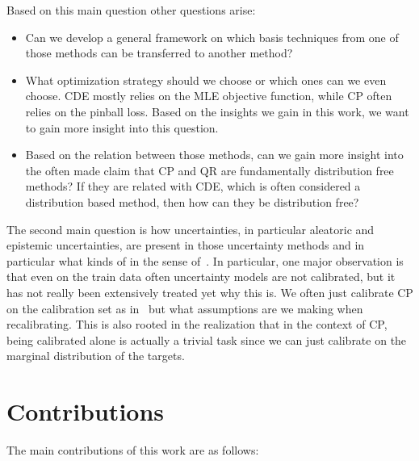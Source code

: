 Based on this main question other questions arise:

\begin{itemize}
    \item Can we develop a general framework on which basis techniques from one of those methods can be transferred to another method?
    \item What optimization strategy should we choose or which ones can we even choose. CDE mostly relies on the MLE objective function, while CP often relies on the pinball loss. Based on the insights we gain in this work, we want to gain more insight into this question.
    \item Based on the relation between those methods, can we gain more insight into the often made claim that CP and QR are fundamentally distribution free methods? If they are related with CDE, which is often considered a distribution based method, then how can they be distribution free?
\end{itemize}

The second main question is how uncertainties, in particular aleatoric and epistemic uncertainties, are present in those uncertainty methods and in particular what kinds of in the sense of~\cite{hullermeier_aleatoric_2021}. In particular, one major observation is that even on the train data often uncertainty models are not calibrated, but it has not really been extensively treated yet why this is. We often just calibrate CP on the calibration set as in~\cite{sesia2021conformal} but what assumptions are we making when recalibrating. This is also rooted in the realization that in the context of CP, being calibrated alone is actually a trivial task since we can just calibrate on the marginal distribution of the targets.

\section{Contributions}\label{sec:contributions}

The main contributions of this work are as follows:

